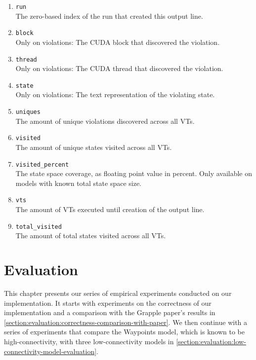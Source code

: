 \documentclass[
fancyheadings, %
%
%
]{stsreprt}
\begin{document}
\begin{enumerate}
    \item \texttt{run} \\
          The zero-based index of the run that created this output line.
    \item \texttt{block} \\
          Only on violations:
          The CUDA block that discovered the violation.
    \item \texttt{thread} \\
          Only on violations:
          The CUDA thread that discovered the violation.
    \item \texttt{state} \\
          Only on violations:
          The text representation of the violating state.
    \item \texttt{uniques} \\
          The amount of unique violations discovered across all VTs.
    \item \texttt{visited} \\
          The amount of unique states visited across all VTs.
    \item \texttt{visited\_percent} \\
          The state space coverage, as floating point value in percent.
          Only available on models with known total state space size.
    \item \texttt{vts} \\
          The amount of VTs executed until creation of the output line.
    \item \texttt{total\_visited} \\
          The amount of total states visited across all VTs.
\end{enumerate}

\chapter{Evaluation}
\label{chapter:evaluation}

This chapter presents our series of empirical experiments conducted on our implementation.
It starts with experiments on the correctness of our implementation and a comparison with the Grapple paper's results in \cref{section:evaluation:correctness-comparison-with-paper}.
We then continue with a series of experiments that compare the Waypoints model, which is known to be high-connectivity, with three low-connectivity models in \cref{section:evaluation:low-connectivity-model-evaluation}.
\end{document}
